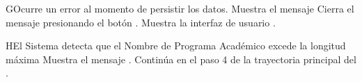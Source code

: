 \begin{UCtrayectoriaA}{G}{Ocurre un error al momento de persistir los datos.}
    \UCpaso Muestra el mensaje 
    \UCpaso[\UCactor] Cierra el mensaje presionando el botón .
    \UCpaso Muestra la interfaz de usuario .
\end{UCtrayectoriaA}
\begin{UCtrayectoriaA}{H}{El Sistema detecta que el Nombre de Programa Académico excede la longitud máxima}
    \UCpaso Muestra el mensaje .
    \UCpaso Continúa en el paso 4 de la trayectoria principal del .
\end{UCtrayectoriaA}